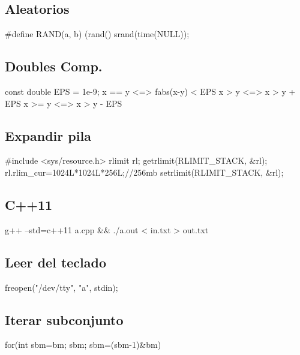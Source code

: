 \subsection*{Aleatorios}
\begin{code}
#define RAND(a, b) (rand()%
srand(time(NULL));
\end{code}
\subsection*{Doubles Comp.}
\begin{code}
const double EPS = 1e-9;
x == y	<=> fabs(x-y) < EPS
x >  y	<=> x > y + EPS
x >= y	<=> x > y - EPS
\end{code}
\subsection*{Expandir pila}
\begin{code}
#include <sys/resource.h>
rlimit rl;
getrlimit(RLIMIT_STACK, &rl);
rl.rlim_cur=1024L*1024L*256L;//256mb
setrlimit(RLIMIT_STACK, &rl);
\end{code}
\subsection*{C++11}
\begin{code}
g++ --std=c++11 a.cpp && ./a.out < in.txt > out.txt
\end{code}
\subsection*{Leer del teclado}
\begin{code}
freopen("/dev/tty", "a", stdin);
\end{code}
\subsection*{Iterar subconjunto}
\begin{code}
for(int sbm=bm; sbm; sbm=(sbm-1)&bm)
\end{code}
